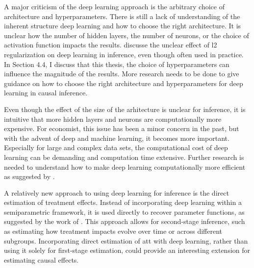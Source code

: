 A major criticism of the deep learning approach is the arbitrary choice of architecture and hyperparameters.
There is still a lack of understanding of the inherent structure deep learning and how to choose the right architecture.
It is unclear how the number of hidden layers, the number of neurons, or the choice of activation function impacts the results.
\citet{farrellDeepNeuralNetworks2021} discusse the unclear effect of l2 regularization on deep learning in inference, even though often used in practice.
In Section 4.4, I discuss that this thesis, the choice of hyperparameters can influence the magnitude of the results.
More research needs to be done to give guidance on how to choose the right architecture and hyperparameters for deep learning in causal inference.

Even though the effect of the size of the arhitecture is unclear for inference, it is intuitive that more hidden layers and neurons are computationally more expensive.
For economist, this issue has been a minor concern in the past, but with the advent of deep and machine learning, it becomes more important.
Especially for large and complex data sets, the computational cost of deep learning can be demanding and computation time extensive.
Further research is needed to understand how to make deep learning computationally more efficient as suggested by \citet{farrellDeepNeuralNetworks2021}.

A relatively new approach to using deep learning for inference is the direct estimation of treatment effects.
Instead of incorporating deep learning within a semiparametric framework, it is used directly to recover parameter functions, as suggested by the work of \citet{DeepLearningIndividual2021}.
This approach allows for second-stage inference, such as estimating how treatment impacts evolve over time or across different subgroups.
Incorporating direct estimation of \ac{att} with deep learning, rather than using it solely for first-stage estimation, could provide an interesting extension for estimating causal effects.
